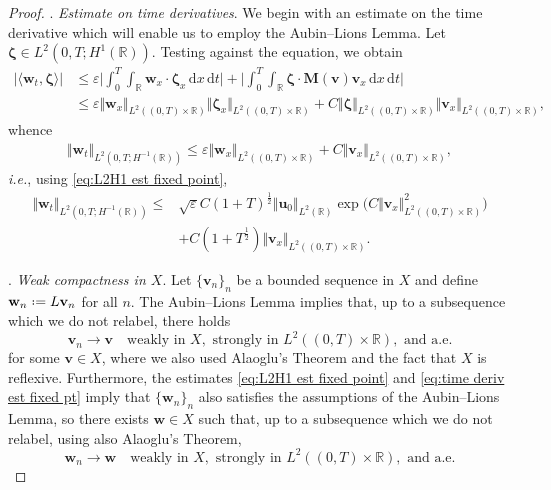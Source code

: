 \documentclass[11pt,a4paper,reqno]{amsart}
\numberwithin{equation}{section}
\theoremstyle{definition}
\theoremstyle{remark}
\newcommand{\bu}{\mathbf{u}}
\newcommand{\bv}{\mathbf{v}}
\newcommand{\bw}{\mathbf{w}}
\renewcommand{\d}{\, \mathrm{d}}
\newcommand{\bM}{\mathbf{M}}
\newcommand{\bzeta}{\boldsymbol{\zeta}}
\renewcommand{\leq}{\leqslant}
\newcommand*{\defeq}{\mathrel{\vcenter{\baselineskip0.5ex \lineskiplimit0pt
                     \hbox{\scriptsize.}\hbox{\scriptsize.}}}%
                     =}
\begin{document}
{\begin{proof}
\smallskip 
{}. \textit{Estimate on time derivatives}. We begin with an estimate on the time derivative which will enable us to employ the Aubin--Lions Lemma. Let $\bzeta \in L^2(0,T;H^1(\mathbb{R}))$. Testing against the equation, we obtain 
\begin{equation*}
   \begin{aligned}
       |\langle \bw_t , \bzeta \rangle| &\leq \varepsilon \Big| \int_0^T \int_\mathbb{R} \bw_x \cdot \bzeta_x \d x \d t \Big| + \Big| \int_0^T \int_\mathbb{R} \bzeta \cdot \bM(\bv) \bv_x \d x \d t \Big| \\ 
       &\leq \varepsilon \Vert \bw_x \Vert_{L^2((0,T)\times\mathbb{R})} \Vert \bzeta_x \Vert_{L^2((0,T)\times\mathbb{R})} + C\Vert \bzeta \Vert_{L^2((0,T)\times\mathbb{R})} \Vert \bv_x \Vert_{L^2((0,T)\times\mathbb{R})}, 
   \end{aligned} 
\end{equation*}
whence 
\begin{equation*}
   \begin{aligned}
       \Vert \bw_t \Vert_{L^2(0,T;H^{-1}(\mathbb{R}))} \leq \varepsilon \Vert \bw_x \Vert_{L^2((0,T)\times\mathbb{R})} + C\Vert \bv_x \Vert_{L^2((0,T)\times\mathbb{R})}, 
   \end{aligned} 
\end{equation*}
\textit{i.e.}, using \eqref{eq:L2H1 est fixed point}, 
\begin{equation}\label{eq:time deriv est fixed pt}
   \begin{aligned}
       \Vert \bw_t \Vert_{L^2(0,T;H^{-1}(\mathbb{R}))} \leq &\sqrt{\varepsilon}C(1+T)^{\frac{1}{2}}\Vert \bu_0 \Vert_{L^2(\mathbb{R})} \exp\Big( C \Vert \bv_x \Vert^2_{L^2((0,T)\times\mathbb{R})} \big) \\ 
       &+ C(1+T^{\frac{1}{2}}) \Vert \bv_x \Vert_{L^2((0,T)\times\mathbb{R})}. 
   \end{aligned} 
\end{equation}

\smallskip 
{}. \textit{Weak compactness in $X$}. Let $\{\bv_n\}_n$ be a bounded sequence in $X$ and define $\bw_n  \defeq  L\bv_n$ for all $n$. The Aubin--Lions Lemma implies that, up to a subsequence which we do not relabel, there holds
\begin{equation}
    \bv_n \to \bv \quad \text{weakly in } X, \text{ strongly in } L^2((0,T)\times\mathbb{R}), \text{ and a.e.} 
\end{equation}
for some $\bv \in X$, where we also used Alaoglu's Theorem and the fact that $X$ is reflexive. Furthermore, the estimates \eqref{eq:L2H1 est fixed point} and \eqref{eq:time deriv est fixed pt} imply that $\{\bw_n\}_n$ also satisfies the assumptions of the Aubin--Lions Lemma, so there exists $\bw \in X$ such that, up to a subsequence which we do not relabel, using also Alaoglu's Theorem, 
\begin{equation}\label{eq:conv from aubin lions}
    \bw_n \to \bw \quad \text{weakly in } X, \text{ strongly in } L^2((0,T)\times\mathbb{R}), \text{ and a.e.} 
\end{equation}


\end{proof}}
\end{document}

